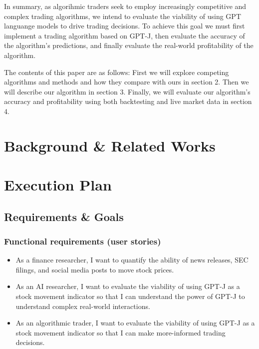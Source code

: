 \documentclass[conference]{IEEEtran}
\begin{document}
In summary, as algorihmic traders seek to employ increasingly competitive and complex trading algorithms, we intend to evaluate the viability of using GPT languange models to drive trading decisions. To achieve this goal we must first implement a trading algorithm based on GPT-J, then evaluate the accuracy of the algorithm's predictions, and finally evaluate the real-world profitability of the algorithm.

The contents of this paper are as follows: First we will explore competing algorithms and methods and how they compare with ours in section 2. Then we will describe our algorithm in section 3. Finally, we will evaluate our algorithm's accuracy and profitability using both backtesting and live market data in section 4. 

\section{Background \& Related Works}
\section{Execution Plan}
\subsection{Requirements \& Goals}
\subsubsection{Functional requirements (user stories)}
\begin{itemize}
\item As a finance researcher, I want to quantify the ability of news releases, SEC filings, and social media posts to move stock prices.
\item As an AI researcher, I want to evaluate the viability of using GPT-J as a stock movement indicator so that I can understand the power of GPT-J to understand complex real-world interactions.
\item As an algorithmic trader, I want to evaluate the viability of using GPT-J as a stock movement indicator so that I can make more-informed trading decisions.
\end{itemize}
\end{document}
